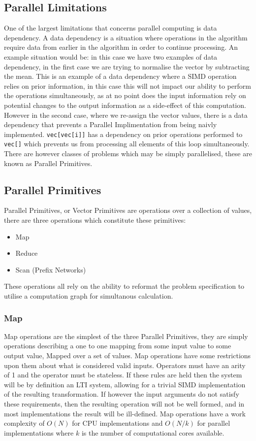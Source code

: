 \subsection{Parallel Limitations} 
One of the largest limitations that concerns parallel computing is data dependency. A data
dependency is a situation where operations in the algorithm require data from earlier in the
algorithm in order to continue processing. An example situation would be:
 in this case we have two examples of data dependency, in
the first case we are trying to normalise the vector by subtracting the mean. This is an example of
a data dependency where a SIMD operation relies on prior information, in this case this will not
impact our ability to perform the operations simultaneously, as at no point does the input
information rely on potential changes to the output information as a side-effect of this
computation. However in the second case, where we re-assign the vector values, there is a data
dependency that prevents a Parallel Implimentation from being naivly implemented.
\lstinline{vec[vec[i]]} has a dependency on prior operations performed to \lstinline{vec[]} which
prevents us from processing all elements of this loop simultaneously. There are however classes of
problems which may be simply parallelised, these are known as Parallel Primitives.

\subsection{Parallel Primitives}
Parallel Primitives, or Vector Primitives are operations over a collection of values, there are
three operations which constitute these primitives:
\begin{itemize}
    \item Map
    \item Reduce
    \item Scan (Prefix Networks)
\end{itemize}
These operations all rely on the ability to reformat the problem specification to utilise a
computation graph for simultanous calculation.


\subsubsection{Map}

Map operations are the simplest of the three Parallel Primitives, they are simply operations
describing a one to one mapping from some input value to some output value, Mapped over a set of
values. Map operations have some restrictions upon them about what is considered valid inputs.
Operators must have an arity of 1 and the operator must be stateless. If these rules are held then
the system will be by definition an LTI system, allowing for a trivial SIMD implementation of the
resulting transformation. If however the input arguments do not satisfy these requirements, then the
resulting operation will not be well formed, and in most implementations the result will be
ill-defined. Map operations have a work complexity of $ O(N) $ for CPU implementations and $ O(N/k)
$ for parallel implementations where $ k $ is the number of computational cores available.


